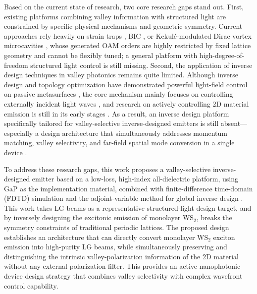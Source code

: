 Based on the current state of research, two core research gaps stand out. First, existing platforms combining valley information with structured light are constrained by specific physical mechanisms and geometric symmetry. Current approaches rely heavily on strain traps \cite{zhang2023single}, BIC \cite{li2023valley}, or Kekulé-modulated Dirac vortex microcavities \cite{li2026unveiling}, whose generated OAM orders are highly restricted by fixed lattice geometry and cannot be flexibly tuned; a general platform with high-degree-of-freedom structured light control is still missing. Second, the application of inverse design techniques in valley photonics remains quite limited. Although inverse design and topology optimization have demonstrated powerful light-field control on passive metasurfaces \cite{li2022empowering, yin2024multi}, the core mechanism mainly focuses on controlling externally incident light waves \cite{molesky2018inverse}, and research on actively controlling 2D material emission is still in its early stages \cite{gelly2023inverse}. As a result, an inverse design platform specifically tailored for valley-selective inverse-designed emitters is still absent—especially a design architecture that simultaneously addresses momentum matching, valley selectivity, and far-field spatial mode conversion in a single device \cite{white2023inverse}.

To address these research gaps, this work proposes a valley-selective inverse-designed emitter based on a low-loss, high-index all-dielectric platform, using $\text{GaP}$ as the implementation material, combined with finite-difference time-domain (FDTD) simulation and the adjoint-variable method for global inverse design \cite{jensen2011topology}. This work takes LG beams as a representative structured-light design target, and by inversely designing the excitonic emission of monolayer $\text{WS}_2$, breaks the symmetry constraints of traditional periodic lattices. The proposed design establishes an architecture that can directly convert monolayer $\text{WS}_2$ exciton emission into high-purity LG beams, while simultaneously preserving and distinguishing the intrinsic valley-polarization information of the 2D material without any external polarization filter. This provides an active nanophotonic device design strategy that combines valley selectivity with complex wavefront control capability.